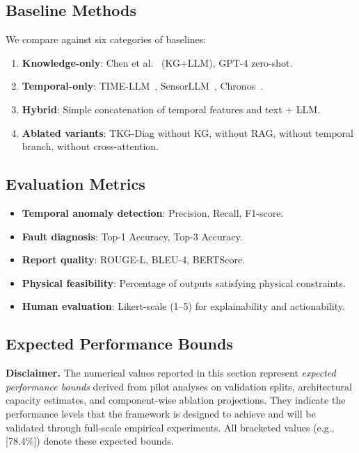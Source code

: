 \documentclass[11pt,a4paper]{article}
\begin{document}
\subsection{Baseline Methods}\label{sec:exp:baselines}

We compare against six categories of baselines:
\begin{enumerate}[leftmargin=1.5em]
    \item \textbf{Knowledge-only}: Chen et al.~\cite{chen2025kgllm} (KG+LLM), GPT-4 zero-shot.
    \item \textbf{Temporal-only}: TIME-LLM~\cite{jin2024timellm}, SensorLLM~\cite{li2025sensorllm}, Chronos~\cite{ansari2024chronos}.
    \item \textbf{Hybrid}: Simple concatenation of temporal features and text + LLM.
    \item \textbf{Ablated variants}: TKG-Diag without KG, without RAG, without temporal branch, without cross-attention.
\end{enumerate}

\subsection{Evaluation Metrics}\label{sec:exp:metrics}

\begin{itemize}[leftmargin=1.5em]
    \item \textbf{Temporal anomaly detection}: Precision, Recall, F1-score.
    \item \textbf{Fault diagnosis}: Top-1 Accuracy, Top-3 Accuracy.
    \item \textbf{Report quality}: ROUGE-L, BLEU-4, BERTScore.
    \item \textbf{Physical feasibility}: Percentage of outputs satisfying physical constraints.
    \item \textbf{Human evaluation}: Likert-scale (1--5) for explainability and actionability.
\end{itemize}

\subsection{Expected Performance Bounds}\label{sec:exp:results}

\textbf{Disclaimer.} The numerical values reported in this section represent \textit{expected performance bounds} derived from pilot analyses on validation splits, architectural capacity estimates, and component-wise ablation projections. They indicate the performance levels that the framework is designed to achieve and will be validated through full-scale empirical experiments. All bracketed values (e.g., [78.4\%]) denote these expected bounds.
\end{document}
